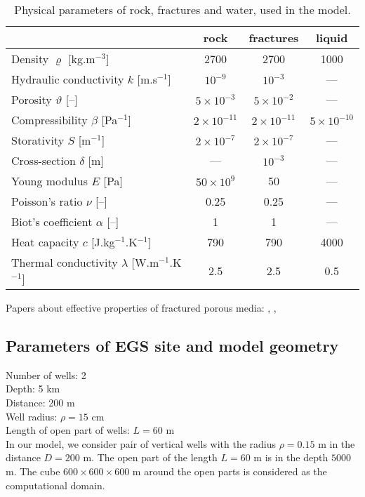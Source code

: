 \documentclass{article}
\begin{document}
\begin{table}
\centering
\begin{tabular}{|l|c|c|c|}
\hline
 & rock & fractures & liquid\\\hline
Density $\varrho$ [kg.m${}^{-3}$] & 2700 & 2700 & 1000 \\
Hydraulic conductivity $k$ [m.s${}^{-1}$] & $10^{-9}$ \cite{Sperl2008} & $10^{-3}$ & ---\\
Porosity $\vartheta$ [--] & $5\times10^{-3}$ & $5\times10^{-2}$ & --- \\
Compressibility $\beta$ [Pa${}^{-1}$] & $2\times10^{-11}$ & $2\times10^{-11}$ & $5\times10^{-10}$ \\
Storativity $S$ [m${}^{-1}$] & $2\times10^{-7}$ & $2\times10^{-7}$ & --- \\
Cross-section $\delta$ [m] & --- & $10^{-3}$ & --- \\
\hline
Young modulus $E$ [Pa] & $50\times10^9$ & 50 & --- \\
Poisson's ratio $\nu$ [--] & 0.25 & 0.25 & --- \\
Biot's coefficient $\alpha$ [--] & 1 & 1 & --- \\
\hline
Heat capacity $c$ [J.kg${}^{-1}$.K${}^{-1}$] & 790 & 790 & 4000 \\
Thermal conductivity $\lambda$ [W.m${}^{-1}$.K${}^{-1}$] & 2.5 & 2.5 & 0.5 \\
\hline
\end{tabular}
\caption{Physical parameters of rock, fractures and water, used in the model.}
\label{tab:params}
\end{table}

Papers about effective properties of fractured porous media: \cite{Snow1969}, \cite{Bonnet2001}, \cite{Olson2003}



\subsection{Parameters of EGS site and model geometry}

Number of wells: 2 \\
Depth: 5 km \\
Distance: 200 m \\
Well radius: $\rho = 15$ cm \\
Length of open part of wells: $L=60$ m \\



In our model, we consider pair of vertical wells with the radius $\rho=0.15$ m in the distance $D=200$ m. The open part of the length $L=60$ m is in the depth $5000$ m. The cube $600 \times 600 \times 600$ m around the open parts is considered as the computational domain.
\end{document}
